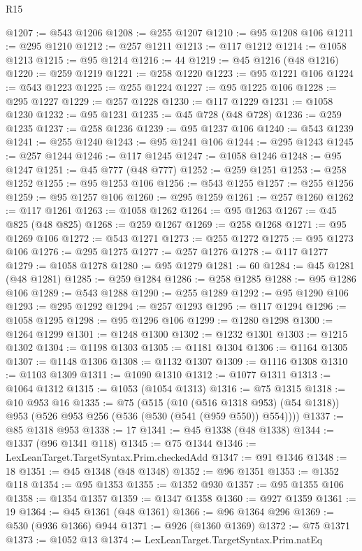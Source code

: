 \begin{lexlean}{R15}
\begin{coremodule}
@1207 := @543 @1206
@1208 := @255 @1207
@1210 := @95 @1208 @106
@1211 := @295 @1210
@1212 := @257 @1211
@1213 := @117 @1212
@1214 := @1058 @1213
@1215 := @95 @1214
@1216 := 44
@1219 := @45 @1216 (@48 @1216)
@1220 := @259 @1219
@1221 := @258 @1220
@1223 := @95 @1221 @106
@1224 := @543 @1223
@1225 := @255 @1224
@1227 := @95 @1225 @106
@1228 := @295 @1227
@1229 := @257 @1228
@1230 := @117 @1229
@1231 := @1058 @1230
@1232 := @95 @1231
@1235 := @45 @728 (@48 @728)
@1236 := @259 @1235
@1237 := @258 @1236
@1239 := @95 @1237 @106
@1240 := @543 @1239
@1241 := @255 @1240
@1243 := @95 @1241 @106
@1244 := @295 @1243
@1245 := @257 @1244
@1246 := @117 @1245
@1247 := @1058 @1246
@1248 := @95 @1247
@1251 := @45 @777 (@48 @777)
@1252 := @259 @1251
@1253 := @258 @1252
@1255 := @95 @1253 @106
@1256 := @543 @1255
@1257 := @255 @1256
@1259 := @95 @1257 @106
@1260 := @295 @1259
@1261 := @257 @1260
@1262 := @117 @1261
@1263 := @1058 @1262
@1264 := @95 @1263
@1267 := @45 @825 (@48 @825)
@1268 := @259 @1267
@1269 := @258 @1268
@1271 := @95 @1269 @106
@1272 := @543 @1271
@1273 := @255 @1272
@1275 := @95 @1273 @106
@1276 := @295 @1275
@1277 := @257 @1276
@1278 := @117 @1277
@1279 := @1058 @1278
@1280 := @95 @1279
@1281 := 60
@1284 := @45 @1281 (@48 @1281)
@1285 := @259 @1284
@1286 := @258 @1285
@1288 := @95 @1286 @106
@1289 := @543 @1288
@1290 := @255 @1289
@1292 := @95 @1290 @106
@1293 := @295 @1292
@1294 := @257 @1293
@1295 := @117 @1294
@1296 := @1058 @1295
@1298 := @95 @1296 @106
@1299 := @1280 @1298
@1300 := @1264 @1299
@1301 := @1248 @1300
@1302 := @1232 @1301
@1303 := @1215 @1302
@1304 := @1198 @1303
@1305 := @1181 @1304
@1306 := @1164 @1305
@1307 := @1148 @1306
@1308 := @1132 @1307
@1309 := @1116 @1308
@1310 := @1103 @1309
@1311 := @1090 @1310
@1312 := @1077 @1311
@1313 := @1064 @1312
@1315 := @1053 (@1054 @1313)
@1316 := @75 @1315
@1318 := @10 @953 @16
@1335 := @75
    (@515
      (@10 (@516 @1318 @953) (@54 @1318))
      @953
      (@526 @953 @256 (@536 (@530 (@541 (@959 @550)) @554))))
@1337 := @85 @1318 @953
@1338 := 17
@1341 := @45 @1338 (@48 @1338)
@1344 := @1337 (@96 @1341 @118)
@1345 := @75 @1344
@1346 := LexLeanTarget.TargetSyntax.Prim.checkedAdd
@1347 := @91 @1346
@1348 := 18
@1351 := @45 @1348 (@48 @1348)
@1352 := @96 @1351
@1353 := @1352 @118
@1354 := @95 @1353
@1355 := @1352 @930
@1357 := @95 @1355 @106
@1358 := @1354 @1357
@1359 := @1347 @1358
@1360 := @927 @1359
@1361 := 19
@1364 := @45 @1361 (@48 @1361)
@1366 := @96 @1364 @296
@1369 := @530 (@936 @1366) @944
@1371 := @926 (@1360 @1369)
@1372 := @75 @1371
@1373 := @1052 @13
@1374 := LexLeanTarget.TargetSyntax.Prim.natEq

\end{coremodule}
\end{lexlean}
